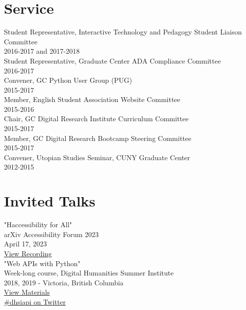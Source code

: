 \documentclass[11pt]{article}
\begin{document}
\section*{Service}
\label{sec:orgheadline7}
Student Representative, Interactive Technology and Pedagogy Student Liaison Committee\\
2016-2017 and 2017-2018\\

Student Representative, Graduate Center ADA Compliance Committee\\
2016-2017\\

Convener, GC Python User Group (PUG)\\
2015-2017\\

Member, English Student Association Website Committee\\
2015-2016\\

Chair, GC Digital Research Institute Curriculum Committee\\
2015-2017\\

Member, GC Digital Research Bootcamp Steering Committee\\
2015-2017\\

Convener, Utopian Studies Seminar, CUNY Graduate Center\\
2012-2015\\
\section*{Invited Talks}
\label{sec:orgheadline8}
"Haccessibility for All"\\
arXiv Accessibility Forum 2023\\
April 17, 2023\\
\href{https://www.youtube.com/watch?v=1v3jFCWQfI8}{View Recording}\\


"Web APIs with Python"\\
Week-long course, Digital Humanities Summer Institute\\
2018, 2019 - Victoria, British Columbia\\
\href{https://github.com/szweibel/DHSI-API-workshop#web-apis-with-python}{View Materials}\\
\href{https://twitter.com/search?q=\%2523dhsiapi&src=typd}{\#dhsiapi on Twitter}\\
\end{document}
